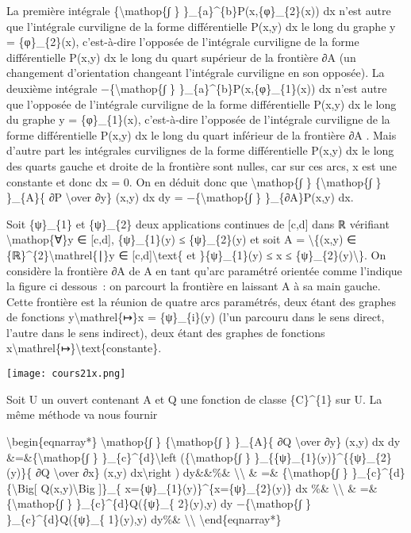 \documentclass[]{article}
\begin{document}
La première intégrale \{\textbackslash{}mathop\{∫ \}
\}\_\{a\}\^{}\{b\}P(x,\{φ\}\_\{2\}(x)) dx n'est autre que l'intégrale
curviligne de la forme différentielle P(x,y) dx le long du graphe y =
\{φ\}\_\{2\}(x), c'est-à-dire l'opposée de l'intégrale curviligne de la
forme différentielle P(x,y) dx le long du quart supérieur de la
frontière ∂A (un changement d'orientation changeant l'intégrale
curviligne en son opposée). La deuxième intégrale
−\{\textbackslash{}mathop\{∫ \} \}\_\{a\}\^{}\{b\}P(x,\{φ\}\_\{1\}(x))
dx n'est autre que l'opposée de l'intégrale curviligne de la forme
différentielle P(x,y) dx le long du graphe y = \{φ\}\_\{1\}(x),
c'est-à-dire l'opposée de l'intégrale curviligne de la forme
différentielle P(x,y) dx le long du quart inférieur de la frontière ∂A .
Mais d'autre part les intégrales curvilignes de la forme différentielle
P(x,y) dx le long des quarts gauche et droite de la frontière sont
nulles, car sur ces arcs, x est une constante et donc dx = 0. On en
déduit donc que \textbackslash{}mathop\{∫ \} \{\textbackslash{}mathop\{∫
\} \}\_\{A\}\{ ∂P \textbackslash{}over ∂y\} (x,y) dx dy =
−\{\textbackslash{}mathop\{∫ \} \}\_\{∂A\}P(x,y) dx.

Soit \{ψ\}\_\{1\} et \{ψ\}\_\{2\} deux applications continues de
{[}c,d{]} dans ℝ vérifiant \textbackslash{}mathop\{∀\}y ∈ {[}c,d{]},
\{ψ\}\_\{1\}(y) ≤ \{ψ\}\_\{2\}(y) et soit A = \textbackslash{}\{(x,y) ∈
\{ℝ\}\^{}\{2\}\textbackslash{}mathrel\{∣\}y ∈
{[}c,d{]}\textbackslash{}text\{ et \}\{ψ\}\_\{1\}(y) ≤ x ≤
\{ψ\}\_\{2\}(y)\textbackslash{}\}. On considère la frontière ∂A de A en
tant qu'arc paramétré orientée comme l'indique la figure ci dessous~: on
parcourt la frontière en laissant A à sa main gauche. Cette frontière
est la réunion de quatre arcs paramétrés, deux étant des graphes de
fonctions y\textbackslash{}mathrel\{↦\}x = \{ψ\}\_\{i\}(y) (l'un
parcouru dans le sens direct, l'autre dans le sens indirect), deux étant
des graphes de fonctions
x\textbackslash{}mathrel\{↦\}\textbackslash{}text\{constante\}.

\texttt{[image: cours21x.png]}

Soit U un ouvert contenant A et Q une fonction de classe \{C\}\^{}\{1\}
sur U. La même méthode va nous fournir

\textbackslash{}begin\{eqnarray*\} \textbackslash{}mathop\{∫ \}
\{\textbackslash{}mathop\{∫ \} \}\_\{A\}\{ ∂Q \textbackslash{}over ∂y\}
(x,y) dx dy \&=\&\{\textbackslash{}mathop\{∫ \}
\}\_\{c\}\^{}\{d\}\textbackslash{}left (\{\textbackslash{}mathop\{∫ \}
\}\_\{\{ψ\}\_\{1\}(y)\}\^{}\{\{ψ\}\_\{2\}(y)\}\{ ∂Q \textbackslash{}over
∂x\} (x,y) dx\textbackslash{}right ) dy\&\&\%\&
\textbackslash{}\textbackslash{} \& =\& \{\textbackslash{}mathop\{∫ \}
\}\_\{c\}\^{}\{d\}\{\textbackslash{}Big{[} Q(x,y)\textbackslash{}Big
{]}\}\_\{ x=\{ψ\}\_\{1\}(y)\}\^{}\{x=\{ψ\}\_\{2\}(y)\} dx \%\&
\textbackslash{}\textbackslash{} \& =\& \{\textbackslash{}mathop\{∫ \}
\}\_\{c\}\^{}\{d\}Q(\{ψ\}\_\{ 2\}(y),y) dy −\{\textbackslash{}mathop\{∫
\} \}\_\{c\}\^{}\{d\}Q(\{ψ\}\_\{ 1\}(y),y) dy\%\&
\textbackslash{}\textbackslash{} \textbackslash{}end\{eqnarray*\}
\end{document}
